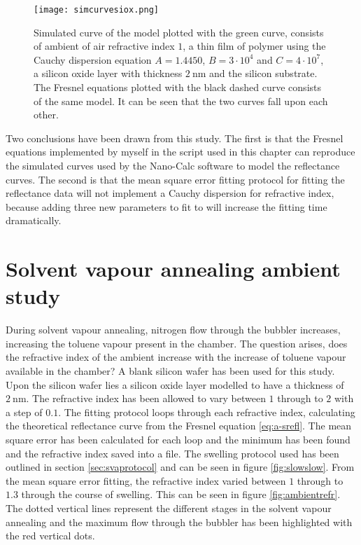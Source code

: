 \documentclass[MasterThesisMain.tex]{subfiles}
\begin{document}
\begin{figure}[H]
\centering
\texttt{[image: simcurvesiox.png]}
\caption{Simulated curve of the model plotted with the green curve, consists of ambient of air refractive index $1$, a thin film of polymer using the Cauchy dispersion equation $A=1.4450$, $B=3 \cdot 10^4$ and $C=4 \cdot 10^7$, a silicon oxide layer with thickness $\SI{2}{\nano\meter}$ and the silicon substrate. The Fresnel equations plotted with the black dashed curve consists of the same model. It can be seen that the two curves fall upon each other.}
\label{fig:simmodel2}
\end{figure}

Two conclusions have been drawn from this study. The first is that the Fresnel equations implemented by myself in the script used in this chapter can reproduce the simulated curves used by the Nano-Calc software to model the reflectance curves. The second is that the mean square error fitting protocol for fitting the reflectance data will not implement a Cauchy dispersion for refractive index, because adding three new parameters to fit to will increase the fitting time dramatically.    
	
\section{Solvent vapour annealing ambient study}
During solvent vapour annealing, nitrogen flow through the bubbler increases, increasing the toluene vapour present in the chamber. The question arises, does the refractive index of the ambient increase with the increase of toluene vapour available in the chamber? A blank silicon wafer has been used for this study. Upon the silicon wafer lies a silicon oxide layer modelled to have a thickness of $\SI{2}{\nano\meter}$. The refractive index has been allowed to vary between $1$ through to $2$ with a step of $0.1$. The fitting protocol loops through each refractive index, calculating the theoretical reflectance curve from the Fresnel equation \ref{eq:a-srefl}. The mean square error has been calculated for each loop and the minimum has been found and the refractive index saved into a file. The swelling protocol used has been outlined in section \ref{sec:svaprotocol} and can be seen in figure \ref{fig:slowslow}. From the mean square error fitting, the refractive index varied between $1$ through to $1.3$ through the course of swelling. This can be seen in figure \ref{fig:ambientrefr}. The dotted vertical lines represent the different stages in the solvent vapour annealing and the maximum flow through the bubbler has been highlighted with the red vertical dots.
\end{document}
